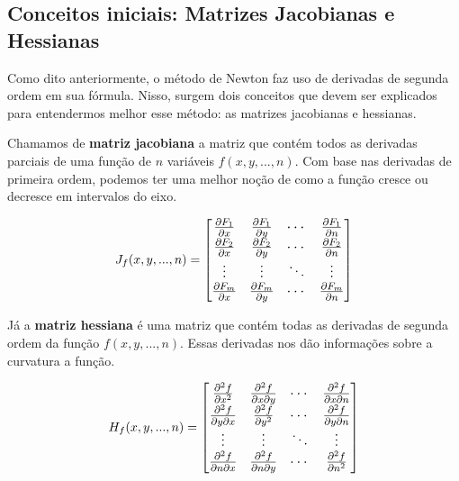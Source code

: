 \subsection{Conceitos iniciais: Matrizes Jacobianas e Hessianas}

Como dito anteriormente, o método de Newton faz uso de derivadas de segunda ordem em sua fórmula. Nisso, surgem dois conceitos que devem ser explicados para entendermos melhor esse método: as matrizes jacobianas e hessianas.

Chamamos de \textbf{matriz jacobiana} a matriz que contém todos as derivadas parciais de uma função de $n$ variáveis $f(x, y, ..., n)$. Com base nas derivadas de primeira ordem, podemos ter uma melhor noção de como a função cresce ou decresce em intervalos do eixo.

    \begin{equation}
        \large J_f(x,y,...,n) =
        \begin{bmatrix}
        \frac{\partial F_1}{\partial x} & \frac{\partial F_1}{\partial y} & \cdots & \frac{\partial F_1}{\partial n} \\
        \frac{\partial F_2}{\partial x} & \frac{\partial F_2}{\partial y} & \cdots & \frac{\partial F_2}{\partial n} \\
        \vdots & \vdots & \ddots & \vdots \\
        \frac{\partial F_m}{\partial x} & \frac{\partial F_m}{\partial y} & \cdots & \frac{\partial F_m}{\partial n}
        \end{bmatrix}
    \end{equation}

Já a \textbf{matriz hessiana} é uma matriz que contém todas as derivadas de segunda ordem da função $f(x, y, ..., n)$. Essas derivadas nos dão informações sobre a curvatura a função.

    \begin{equation}
        \large H_f(x,y,...,n) =
        \begin{bmatrix}
        \frac{\partial^2 f}{\partial x^2} & \frac{\partial^2 f}{\partial x\partial y} & \cdots & \frac{\partial^2 f}{\partial x \partial n} \\
        \frac{\partial^2 f}{\partial y \partial x} & \frac{\partial^2 f}{\partial y^2} & \cdots & \frac{\partial^2 f}{\partial y \partial n} \\
        \vdots & \vdots & \ddots & \vdots \\
        \frac{\partial^2 f}{\partial n \partial x} & \frac{\partial^2 f}{\partial n \partial y} & \cdots & \frac{\partial^2 f}{\partial n^2}
        \end{bmatrix}
    \end{equation}

